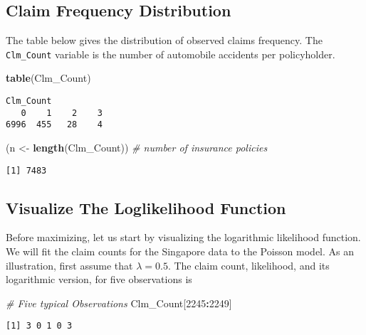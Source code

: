 \documentclass[]{book}
\newenvironment{Shaded}{\begin{snugshade}}{\end{snugshade}}
\newcommand{\KeywordTok}[1]{\textcolor[rgb]{0.13,0.29,0.53}{\textbf{#1}}}
\newcommand{\DecValTok}[1]{\textcolor[rgb]{0.00,0.00,0.81}{#1}}
\newcommand{\StringTok}[1]{\textcolor[rgb]{0.31,0.60,0.02}{#1}}
\newcommand{\CommentTok}[1]{\textcolor[rgb]{0.56,0.35,0.01}{\textit{#1}}}
\newcommand{\OperatorTok}[1]{\textcolor[rgb]{0.81,0.36,0.00}{\textbf{#1}}}
\newcommand{\NormalTok}[1]{#1}
\theoremstyle{definition}
\theoremstyle{definition}
\theoremstyle{definition}
\theoremstyle{remark}
\begin{document}
\subsection{Claim Frequency
Distribution}\label{claim-frequency-distribution-1}

The table below gives the distribution of observed claims frequency. The
\texttt{Clm\_Count} variable is the number of automobile accidents per
policyholder.

\begin{Shaded}
\begin{Highlighting}[]
\KeywordTok{table}\NormalTok{(Clm_Count) }
\end{Highlighting}
\end{Shaded}

\begin{verbatim}
Clm_Count
   0    1    2    3 
6996  455   28    4 
\end{verbatim}

\begin{Shaded}
\begin{Highlighting}[]
\NormalTok{(n <-}\StringTok{ }\KeywordTok{length}\NormalTok{(Clm_Count))  }\CommentTok{# number of insurance policies }
\end{Highlighting}
\end{Shaded}

\begin{verbatim}
[1] 7483
\end{verbatim}

\subsection{Visualize The Loglikelihood
Function}\label{visualize-the-loglikelihood-function}

Before maximizing, let us start by visualizing the logarithmic
likelihood function. We will fit the claim counts for the Singapore data
to the Poisson model. As an illustration, first assume that
\(\lambda = 0.5\). The claim count, likelihood, and its logarithmic
version, for five observations is

\begin{Shaded}
\begin{Highlighting}[]
\CommentTok{#  Five typical Observations}
\NormalTok{Clm_Count[}\DecValTok{2245}\OperatorTok{:}\DecValTok{2249}\NormalTok{]}
\end{Highlighting}
\end{Shaded}

\begin{verbatim}
[1] 3 0 1 0 3
\end{verbatim}
\end{document}
